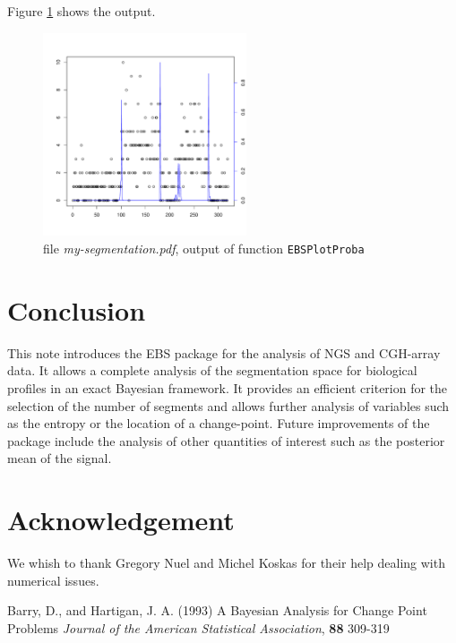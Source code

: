 \documentclass{bioinfo}
\begin{document}
\begin{methods}
Figure \ref{fig:02} shows the output. 

\begin{figure}[!h]%
\centerline{\includegraphics[width=6cm]{my-segmentation.pdf}}
\caption{file \textit{my-segmentation.pdf}, output of function \texttt{EBSPlotProba}}\label{fig:02}
\end{figure}




\section{Conclusion}

This note introduces the EBS package for the analysis of NGS and CGH-array data. It allows a complete analysis of the segmentation space for biological profiles in an exact Bayesian framework. 
It provides an efficient criterion for the selection of the number of segments and allows further analysis of variables such as the entropy or the location of a change-point. 
Future improvements of the package include the analysis of other quantities of interest such as the posterior mean of the signal.



\section*{Acknowledgement}
We whish to thank Gregory Nuel and Michel Koskas for their help dealing with numerical issues.


%
%
%
%
%
%
%
%
%


\begin{thebibliography}{}

 Barry, D., and Hartigan, J. A. (1993) A Bayesian Analysis for Change Point Problems {\it Journal of the American Statistical Association}, {\bf 88} 309-319


\end{thebibliography}
\end{methods}
\end{document}

